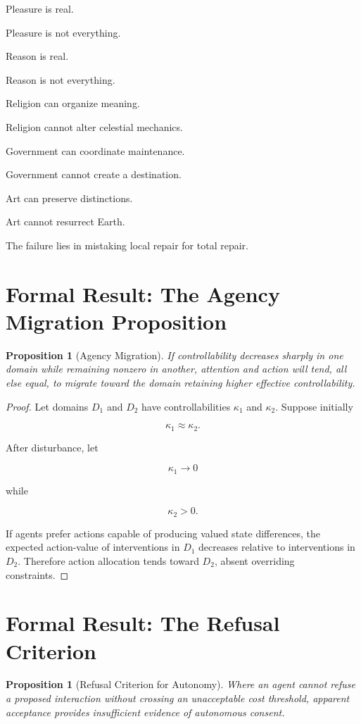 \documentclass[11pt,oneside]{book}
\newtheorem{proposition}[theorem]{Proposition}
\theoremstyle{definition}
\theoremstyle{remark}
\begin{document}
Pleasure is real.

Pleasure is not everything.

Reason is real.

Reason is not everything.

Religion can organize meaning.

Religion cannot alter celestial mechanics.

Government can coordinate maintenance.

Government cannot create a destination.

Art can preserve distinctions.

Art cannot resurrect Earth.

The failure lies in mistaking local repair for total repair.

\section{Formal Result: The Agency Migration Proposition}

\begin{proposition}[Agency Migration]
If controllability decreases sharply in one domain while remaining nonzero in another, attention and action will tend, all else equal, to migrate toward the domain retaining higher effective controllability.
\end{proposition}

\begin{proof}
Let domains \(D_1\) and \(D_2\) have controllabilities \(\kappa_1\) and \(\kappa_2\). Suppose initially

\[
\kappa_1\approx\kappa_2.
\]

After disturbance, let

\[
\kappa_1\rightarrow0
\]

while

\[
\kappa_2>0.
\]

If agents prefer actions capable of producing valued state differences, the expected action-value of interventions in \(D_1\) decreases relative to interventions in \(D_2\). Therefore action allocation tends toward \(D_2\), absent overriding constraints.
\end{proof}

\section{Formal Result: The Refusal Criterion}

\begin{proposition}[Refusal Criterion for Autonomy]
Where an agent cannot refuse a proposed interaction without crossing an unacceptable cost threshold, apparent acceptance provides insufficient evidence of autonomous consent.
\end{proposition}
\end{document}
